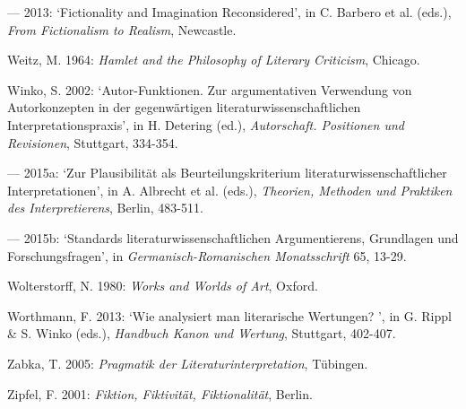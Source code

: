 \begin{hangparas}{.5cm}{1}
--- 2013: `Fictionality and Imagination Reconsidered', in C. Barbero et al. (eds.), \emph{From Fictionalism to Realism}, Newcastle.

Weitz, M. 1964: \emph{Hamlet and the Philosophy of Literary Criticism}, Chicago.

Winko, S. 2002: `Autor-Funktionen. Zur argumentativen Verwendung von Autorkonzepten in der gegenw\"artigen literaturwissenschaftlichen Interpretationspraxis', in H. Detering (ed.), \emph{Autorschaft. Positionen und Revisionen}, Stuttgart, 334-354.

--- 2015a: `Zur Plausibilit\"at als Beurteilungskriterium literaturwissenschaftlicher Interpretationen', in A. Albrecht et al. (eds.), \emph{Theorien, Methoden und Praktiken des Interpretierens}, Berlin, 483-511.

--- 2015b: `Standards literaturwissenschaftlichen Argumentierens, Grundlagen und Forschungsfragen', in \emph{Germanisch-Romanischen Monatsschrift} 65, 13-29.

Wolterstorff, N. 1980: \emph{Works and Worlds of Art}, Oxford.

Worthmann, F. 2013: `Wie analysiert man literarische Wertungen? ', in G. Rippl \& S. Winko (eds.), \emph{Handbuch Kanon und Wertung}, Stuttgart, 402-407.

Zabka, T. 2005: \emph{Pragmatik der Literaturinterpretation}, T\"ubingen.

Zipfel, F. 2001: \emph{Fiktion, Fiktivit\"at, Fiktionalit\"at}, Berlin.

\end{hangparas}
